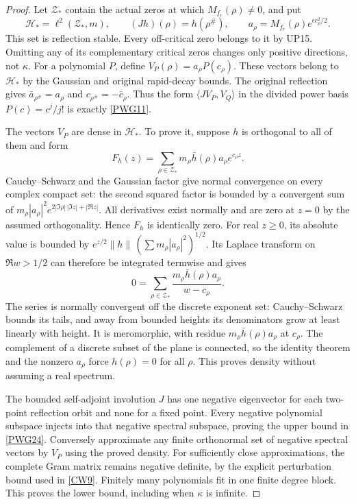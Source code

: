 \begin{proof}
Let $\mathcal Z_*$ contain the actual zeros at which $M_{f_r}(\rho)\ne0$, and put
\[
 \mathcal H_* =\ell^2(\mathcal Z_*,m),\qquad
 (Jh)(\rho)=h(\rho^\#),\qquad
 a_\rho=M_{f_r}(\rho)e^{\epsilon c_\rho^2/2}.
\]
This set is reflection stable. Every off-critical zero belongs to it by UP15. Omitting any of its complementary critical zeros changes only positive directions, not $\kappa$. For a polynomial $P$, define $V_P(\rho)=a_\rho P(c_\rho)$. These vectors belong to $\mathcal H_*$ by the Gaussian and original rapid-decay bounds. The original reflection gives $\bar a_{\rho^\#}=a_\rho$ and $c_{\rho^\#}=-\bar c_\rho$. Thus the form $\langle JV_P,V_Q\rangle$ in the divided power basis $P(c)=c^j/j!$ is exactly \eqref{PWG11}.

The vectors $V_P$ are dense in $\mathcal H_*$. To prove it, suppose $h$ is orthogonal to all of them and form
\[
 F_h(z)=\sum_{\rho\in\mathcal Z_*}m_\rho\bar h(\rho)a_\rho e^{c_\rho z}.
\]
Cauchy--Schwarz and the Gaussian factor give normal convergence on every complex compact set: the second squared factor is bounded by a convergent sum of $m_\rho|a_\rho|^2e^{2|\Im\rho|\,|\Im z|+|\Re z|}$. All derivatives exist normally and are zero at $z=0$ by the assumed orthogonality. Hence $F_h$ is identically zero. For real $z\ge0$, its absolute value is bounded by
$e^{z/2}\|h\|\,(\sum m_\rho|a_\rho|^2)^{1/2}$.
Its Laplace transform on $\Re w>1/2$ can therefore be integrated termwise and gives
\[
 0=\sum_{\rho\in\mathcal Z_*}
       \frac{m_\rho\bar h(\rho)a_\rho}{w-c_\rho}.
\]
The series is normally convergent off the discrete exponent set: Cauchy--Schwarz bounds its tails, and away from bounded heights its denominators grow at least linearly with height. It is meromorphic, with residue $m_\rho\bar h(\rho)a_\rho$ at $c_\rho$. The complement of a discrete subset of the plane is connected, so the identity theorem and the nonzero $a_\rho$ force $h(\rho)=0$ for all $\rho$. This proves density without assuming a real spectrum.

The bounded self-adjoint involution $J$ has one negative eigenvector for each two-point reflection orbit and none for a fixed point. Every negative polynomial subspace injects into that negative spectral subspace, proving the upper bound in \eqref{PWG24}. Conversely approximate any finite orthonormal set of negative spectral vectors by $V_P$ using the proved density. For sufficiently close approximations, the complete Gram matrix remains negative definite, by the explicit perturbation bound used in \eqref{CW9}. Finitely many polynomials fit in one finite degree block. This proves the lower bound, including when $\kappa$ is infinite.
\end{proof}

